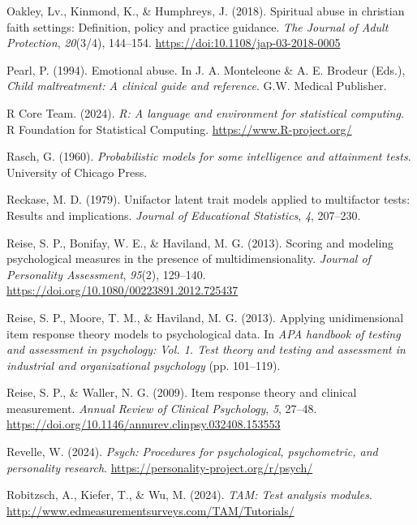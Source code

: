 \documentclass[
  letterpaper,
]{article}
\newlength{\cslhangindent}
\newenvironment{CSLReferences}[2] %
 {\begin{list}{}{%
  \setlength{\itemindent}{0pt}
  \setlength{\leftmargin}{0pt}
  \setlength{\parsep}{0pt}
  \ifodd #1
   \setlength{\leftmargin}{\cslhangindent}
   \setlength{\itemindent}{-1\cslhangindent}
  \fi
  \setlength{\itemsep}{#2\baselineskip}}}
 {\end{list}}
\begin{document}
\begin{CSLReferences}{1}{0}
Oakley, Lv., Kinmond, K., \& Humphreys, J. (2018). Spiritual abuse in
christian faith settings: Definition, policy and practice guidance.
\emph{The Journal of Adult Protection}, \emph{20}(3/4), 144--154.
\url{https://doi:10.1108/jap-03-2018-0005}

Pearl, P. (1994). Emotional abuse. In J. A. Monteleone \& A. E. Brodeur
(Eds.), \emph{Child maltreatment: A clinical guide and reference}. G.W.
Medical Publisher.

R Core Team. (2024). \emph{R: A language and environment for statistical
computing}. R Foundation for Statistical Computing.
\url{https://www.R-project.org/}

Rasch, G. (1960). \emph{Probabilistic models for some intelligence and
attainment tests}. University of Chicago Press.

Reckase, M. D. (1979). Unifactor latent trait models applied to
multifactor tests: Results and implications. \emph{Journal of
Educational Statistics}, \emph{4}, 207--230.

Reise, S. P., Bonifay, W. E., \& Haviland, M. G. (2013). Scoring and
modeling psychological measures in the presence of multidimensionality.
\emph{Journal of Personality Assessment}, \emph{95}(2), 129--140.
\url{https://doi.org/10.1080/00223891.2012.725437}

Reise, S. P., Moore, T. M., \& Haviland, M. G. (2013). Applying
unidimensional item response theory models to psychological data. In
\emph{APA handbook of testing and assessment in psychology: Vol. 1. Test
theory and testing and assessment in industrial and organizational
psychology} (pp. 101--119).

Reise, S. P., \& Waller, N. G. (2009). Item response theory and clinical
measurement. \emph{Annual Review of Clinical Psychology}, \emph{5},
27--48. \url{https://doi.org/10.1146/annurev.clinpsy.032408.153553}

Revelle, W. (2024). \emph{Psych: Procedures for psychological,
psychometric, and personality research}.
\url{https://personality-project.org/r/psych/}

Robitzsch, A., Kiefer, T., \& Wu, M. (2024). \emph{TAM: Test analysis
modules}. \url{http://www.edmeasurementsurveys.com/TAM/Tutorials/}


\end{CSLReferences}
\end{document}
